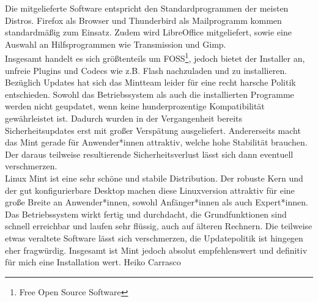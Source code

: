 {{	Die mitgelieferte Software entspricht den Standardprogrammen der meisten Distros. Firefox als Browser und Thunderbird als Mailprogramm
	kommen standardmäßig zum Einsatz. Zudem wird LibreOffice mitgeliefert,
    sowie eine Auswahl an Hilfsprogrammen wie Transmission und Gimp.\\
	Insgesamt handelt es sich größtenteils um FOSS\footnote{Free Open Source Software}, jedoch bietet der Installer an,
	unfreie Plugins und Codecs wie z.B. Flash nachzuladen und zu
    installieren.\columnbreak\\
	Bezüglich Updates hat sich das Mintteam leider für eine recht harsche Politik entschieden. Sowohl das Betriebssystem als auch die
	installierten Programme werden nicht geupdatet, wenn keine hunderprozentige Kompatibilität gewährleistet ist. Dadurch wurden in der
	Vergangenheit bereits Sicherheitsupdates erst mit großer Verspätung ausgeliefert. Andererseits macht das Mint gerade für Anwender*innen
	attraktiv, welche hohe Stabilität brauchen. Der daraus teilweise
    resultierende Sicherheitsverlust lässt sich dann eventuell verschmerzen.
	\medskip\\
	Linux Mint ist eine sehr schöne und stabile Distribution. Der robuste Kern und der gut konfigurierbare Desktop machen diese Linuxversion
	attraktiv für eine große Breite an Anwender*innen, sowohl Anfänger*innen als auch Expert*innen. Das Betriebssystem wirkt fertig und durchdacht,
	die Grundfunktionen sind schnell erreichbar und laufen sehr flüssig, auch auf älteren Rechnern. Die teilweise etwas veraltete Software
	lässt sich verschmerzen, die Updatepolitik ist hingegen eher fragwürdig. Insgesamt ist Mint jedoch absolut empfehlenswert und definitiv für mich
	eine Installation wert.
	}
	{Heiko Carrasco}}
	
	\vfill


\newpage
